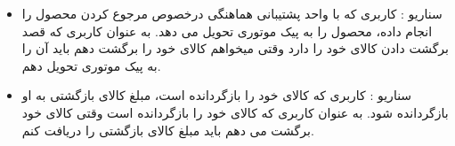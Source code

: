 \documentclass[14pt]{article}
\begin{document}
\begin{flushright}
\begin{itemize}
\item سناریو : کاربری که با واحد پشتیبانی هماهنگی درخصوص مرجوع کردن محصول را انجام داده، محصول را به پیک موتوری تحویل می دهد.
\newline
به عنوان  کاربری که قصد برگشت دادن کالای خود را دارد
\newline
وقتی میخواهم کالای خود را برگشت دهم
\newline
باید آن را به پیک موتوری تحویل دهم.

\item سناریو : کاربری که کالای خود را بازگردانده است، مبلغ کالای بازگشتی به او بازگردانده شود.
\newline
به عنوان کاربری که کالای خود را بازگردانده است
\newline
وقتی کالای خود برگشت می دهم
\newline
باید مبلغ کالای بازگشتی را دریافت کنم.


\end{itemize}
\end{flushright}
\end{document}
